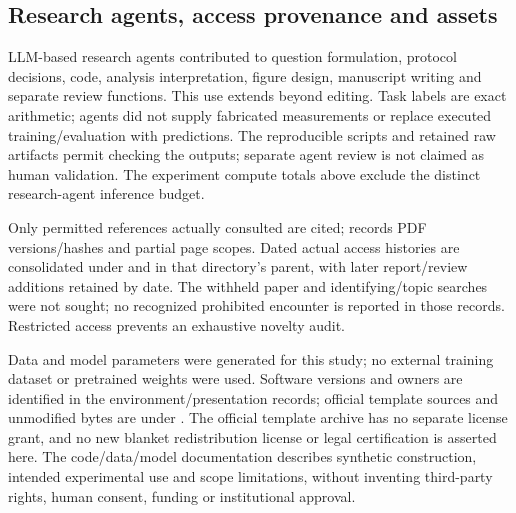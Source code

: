 \subsection{Research agents, access provenance and assets}
\label{app:agents}
LLM-based research agents contributed to question formulation, protocol decisions, code, analysis interpretation, figure design, manuscript writing and separate review functions. This use extends beyond editing. Task labels are exact arithmetic; agents did not supply fabricated measurements or replace executed training/evaluation with predictions. The reproducible scripts and retained raw artifacts permit checking the outputs; separate agent review is not claimed as human validation. The experiment compute totals above exclude the distinct research-agent inference budget.

Only permitted references actually consulted are cited;  records PDF versions/hashes and partial page scopes. Dated actual access histories are consolidated under  and  in that directory's parent, with later report/review additions retained by date. The withheld paper and identifying/topic searches were not sought; no recognized prohibited encounter is reported in those records. Restricted access prevents an exhaustive novelty audit.

Data and model parameters were generated for this study; no external training dataset or pretrained weights were used. Software versions and owners are identified in the environment/presentation records; official template sources and unmodified bytes are under . The official template archive has no separate license grant, and no new blanket redistribution license or legal certification is asserted here. The code/data/model documentation describes synthetic construction, intended experimental use and scope limitations, without inventing third-party rights, human consent, funding or institutional approval.

